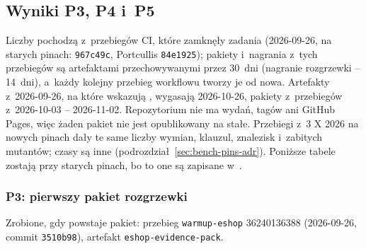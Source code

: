 \subsection{Wyniki P3, P4 i~P5}\label{sec:bench-wyniki}

Liczby pochodzą z~przebiegów CI, które zamknęły zadania (2026-09-26, na starych pinach:
 \texttt{967c49c}, Portcullis \texttt{84e1925}); pakiety i~nagrania z~tych
przebiegów są artefaktami przechowywanymi przez 30~dni (nagranie rozgrzewki -- 14~dni),
a~każdy kolejny przebieg workflowu tworzy je od nowa. Artefakty z~2026-09-26, na które
wskazują , wygasają 2026-10-26, pakiety z~przebiegów z~2026-10-03 --
2026-11-02. Repozytorium nie ma wydań, tagów ani GitHub Pages, więc żaden pakiet nie jest
opublikowany na stałe. Przebiegi z~3 X 2026 na nowych pinach dały te same liczby wymian, klauzul,
znalezisk i~zabitych mutantów; czasy są inne (podrozdział~\ref{sec:bench-pins-adr}).
Poniższe tabele zostają przy starych pinach, bo to one są zapisane w~.


\subsubsection{P3: pierwszy pakiet rozgrzewki}\label{sec:bench-wyniki-p3}

Zrobione, gdy powstaje pakiet: przebieg \texttt{warmup-eshop} 36240136388 (2026-09-26,
commit \texttt{3510b98}), artefakt \texttt{eshop-evidence-pack}.

